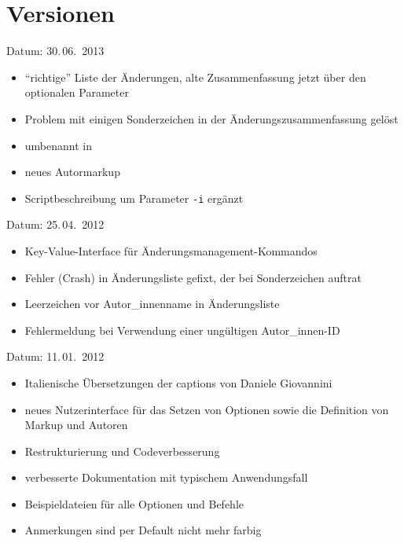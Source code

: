\section{Versionen}
\label{sec:versions}


Datum: 30.\,06.~2013
\begin{itemize}
	\item "`richtige"' Liste der Änderungen, alte Zusammenfassung jetzt über den optionalen Parameter 
	\item Problem mit einigen Sonderzeichen in der Änderungszusammenfassung gelöst
	\item {} umbenannt in 
	\item neues Autormarkup 
	\item Scriptbeschreibung um Parameter \texttt{-i} ergänzt
\end{itemize}


Datum: 25.\,04.~2012
\begin{itemize}
	\item Key-Value-Interface für Änderungsmanagement-Kommandos
	\item Fehler (Crash) in Änderungsliste gefixt, der bei Sonderzeichen auftrat
	\item Leerzeichen vor Autor\_innenname in Änderungsliste
	\item Fehlermeldung bei Verwendung einer ungültigen Autor\_innen-ID
\end{itemize}


Datum: 11.\,01.~2012
\begin{itemize}
	\item Italienische Übersetzungen der captions von Daniele Giovannini
	\item neues Nutzerinterface für das Setzen von Optionen sowie die Definition von Markup und Autoren
	\item Restrukturierung und Codeverbesserung
	\item verbesserte Dokumentation mit typischem Anwendungsfall
	\item Beispieldateien für alle Optionen und Befehle
	\item Anmerkungen sind per Default nicht mehr farbig
\end{itemize}

